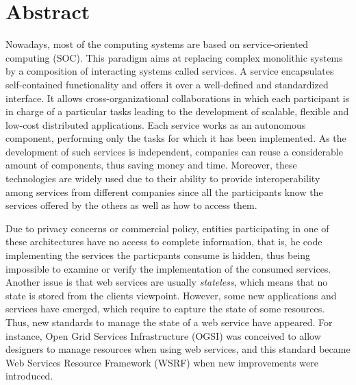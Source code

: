 \chapter*{Abstract}\label{c0}

Nowadays, most of the computing systems are based on service-oriented computing (SOC). 
This paradigm aims at replacing complex monolithic systems by a composition of interacting systems
called services. A service encapsulates self-contained functionality and offers it over
a well-defined and standardized interface. It allows cross-organizational collaborations 
in which each participant is in charge of a particular tasks leading to 
the development of scalable, flexible and low-cost distributed applications. Each service
works as an autonomous component, performing only the tasks for which it has been implemented. 
As the development of such services is independent, companies can reuse a considerable amount of components, 
thus saving money and time. Moreover, these technologies are widely used 
due to their ability to provide interoperability among services 
from different companies since all the participants know the services offered by the others as well as how to access them. 

Due to privacy concerns or commercial policy, entities participating in one of 
these architectures have no access to complete information, that is, 
he code implementing the services the particpants consume is hidden, 
thus being impossible to examine or verify the implementation of the consumed services.
Another issue is that web services are usually \emph{stateless},
which means that no state is stored from the clients viewpoint. 
However, some new applications and services have emerged, which
require to capture the state of some resources. Thus,
new standards to manage the state of a web service have appeared. For instance,
Open Grid Services Infrastructure (OGSI) was conceived to allow designers to manage resources when using web services, and
this standard became Web Services Resource Framework (WSRF) when new improvements were introduced. 

